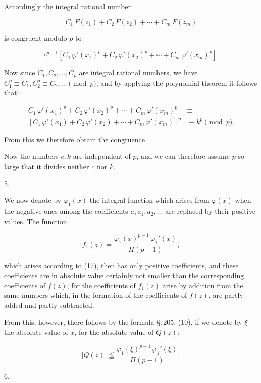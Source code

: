 Accordingly the integral rational number

\[
C_1\,F(z_1)+C_2\,F(z_2)+\cdots+C_m\,F(z_m)
\]

is congruent modulo $p$ to

\[
c^{p-1}\left[C_1\,\varphi'(x_1)^p+C_2\,\varphi'(x_2)^p+\cdots+C_m\,\varphi'(x_m)^p\right].
\]

Now since $C_1, C_2, \ldots, C_p$ are integral rational numbers, %
we have $C_1^p\equiv C_1, C_2^p\equiv C_2, \ldots \pmod{p}$, and by applying the polynomial theorem it follows that:

\[
\begin{aligned}
C_1\,\varphi'(x_1)^p+C_2\,\varphi'(x_2)^p+\cdots+C_m\,\varphi'(x_m)^p &\equiv \\
\left[C_1\,\varphi'(x_1)+C_2\,\varphi'(x_2)+\cdots+C_m\,\varphi'(x_m)\right]^p &\equiv k^p \pmod{p}.
\end{aligned}
\]

From this we therefore obtain the congruence


Now the numbers $c, k$ are independent of $p$, and we can therefore assume $p$ so large that it divides neither $c$ nor $k$.

5. 

We now denote by $\varphi_1(x)$ the integral function which arises from $\varphi(x)$ when the negative ones among the coefficients $a, a_1, a_2, \ldots$ are replaced by their positive values. The function

\[
f_1(z) = \dfrac{\varphi_1(x)^{p-1}\,\varphi_1'(x)}{\Pi(p-1)},
\]

which arises according to (17), then has only positive coefficients, and these coefficients are in absolute value certainly not smaller than the corresponding coefficients of $f(z)$; for the coefficients of $f_1(z)$ arise by addition from the same numbers which, in the formation of the coefficients of $f(z)$, are partly added and partly subtracted.

From this, however, there follows by the formula \S.\,205, (10), if we denote by $\xi$ the absolute value of $x$, for the absolute value of $Q(z)$:

\[
|Q(z)| \leqq \dfrac{\varphi_1(\xi)^{p-1}\,\varphi_1'(\xi)}{\Pi(p-1)},
\]

6. 
